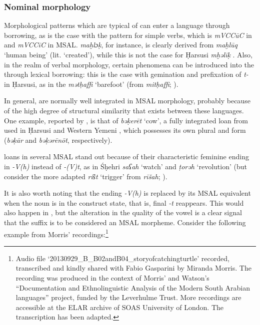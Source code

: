 \documentclass[output=paper]{langsci/langscibook}
\begin{document}
 \subsubsection{Nominal morphology}\label{sec:key:nomorph}

Morphological patterns which are typical of  can enter a language through borrowing, as is the case with the   pattern for simple verbs, which is \textit{mVCCūC} in  and \textit{mVCCīC} in MSAL.  \textit{maḫlɔḳ}, for instance, is clearly derived from  \textit{maḫlūq} ‘human being’ (lit. ‘created’), while this is not the case for Ḥarsusi \textit{mḫəlīḳ} \citep[299]{Lonnet2011}. Also, in the realm of verbal  morphology, certain phenomena can be introduced into the  through lexical borrowing: this is the case with gemination and prefixation of \textit{t-} in Ḥarsusi, as in the  \textit{mətḥaffi} ‘barefoot’ (from   \textit{mitḥaffi}; \citealt{Lonnet2011}).

In general,   are normally well integrated in MSAL morphology, probably because of the high degree of structural similarity that exists between these languages. One example, reported by \citet{Lonnet2011}, is that of \textit{bəḳerēt} ‘cow’, a fully integrated loan from  used in Ḥarsusi and {Western} {Yemeni} , which possesses its own plural and  form (\textit{bəḳār} and \textit{bəḳərēnōt}, respectively).

 loans in several MSAL stand out because of their characteristic feminine ending in \textit{-V(h)} instead of \textit{-(V)t}, as in Śḥehri \textit{saʕah} ‘watch’ and \textit{ṭorəh} ‘revolution’ (but consider the more adapted \textit{ris͂t} ‘trigger’ from   \textit{rīšah}; \citealt{Lonnet2011}). 

It is also worth noting that the  ending \textit{-V(h)} is replaced by its MSAL equivalent when the noun is in the construct state, that is, final \textit{-t} reappears. This would also happen in , but the alteration in the quality of the vowel is a clear signal that the suffix is to be considered an MSAL morpheme. Consider the following example from Morris’  recordings:\footnote{Audio 
  file ‘20130929\_B\_B02andB04\_storyofcatchingturtle’ recorded, transcribed and kindly shared with Fabio Gasparini by Miranda Morris. The recording was produced in the context of Morris’ and Watson’s “Documentation and Ethnolinguistic Analysis of the Modern South Arabian languages” project, funded by the Leverhulme Trust. More recordings are accessible at the ELAR archive of SOAS University of London. The transcription has been adapted.
  }
\end{document}
